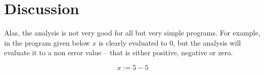 \documentclass[11pt,oneside,a4paper]{article}
\begin{document}
      

\section*{Discussion}
  Alas, the analysis is not very good for all but very simple programs. For
  example, in the program given below $x$ is clearly evaluated to $0$, but the
  analysis will evaluate it to a non error value -- that is either positive,
  negative or zero.

  \[
    x := 5-5
  \]
\end{document}
